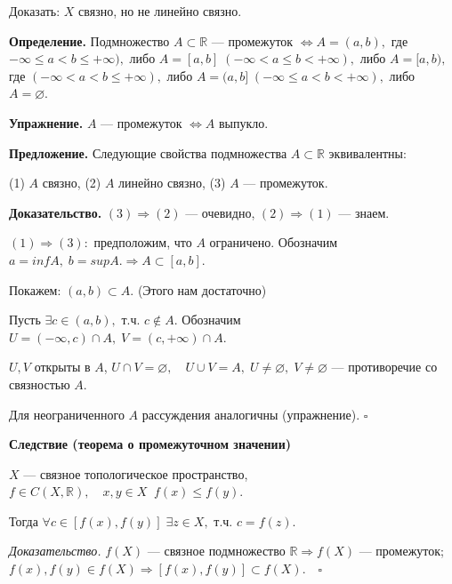 \documentclass[12pt,a4paper]{article}
\begin{document}
Доказать: $X$ связно, но не линейно связно. 

\textbf{Определение.} Подмножество $A \subset \mathbb{R}$ --- промежуток $\Leftrightarrow A = (a, b),$ где $-\infty \leq a < b \leq +\infty),$ либо $A = [a, b] \; (-\infty < a \leq b < +\infty),$ либо $A = [a, b),$ где $(-\infty < a < b \leq +\infty),$ либо $A = (a, b] \; (-\infty \leq a < b < +\infty),$ либо $A = \varnothing.$ 

\textbf{Упражнение.} $A$ --- промежуток $\Leftrightarrow A$ выпукло.

\textbf{Предложение.} Следующие свойства подмножества $A \subset \mathbb{R}$ эквивалентны:

(1) $A$ связно, (2) $A$ линейно связно, (3) $A$ --- промежуток. 

\textbf{Доказательство.} $(3) \Rightarrow (2)$ --- очевидно, $(2) \Rightarrow (1)$ --- знаем. 

$(1) \Rightarrow (3):$ предположим, что $A$ ограничено. Обозначим $a = inf A, \; b = sup A. \Rightarrow A \subset [a, b].$

Покажем: $(a, b) \subset A.$ (Этого нам достаточно)

Пусть $\exists c \in (a, b),$ т.ч. $c \not \in A.$ Обозначим $U = (-\infty, c) \cap A, \; V = (c, +\infty) \cap A.$

$U, V$ открыты в $A$, $U \cap V = \varnothing,\quad U \cup V = A, \; U \neq \varnothing, \; V \neq \varnothing$ --- противоречие со связностью $A$.

Для неограниченного $A$ рассуждения аналогичны (упражнение). $\square$

\textbf{Следствие (теорема о промежуточном значении)}

$X$ --- связное топологическое пространство, $f \in C(X, \mathbb{R}), \quad x, y \in X \;\; f(x) \leq f(y).$

Тогда $\forall c \in [f(x), f(y)] \; \exists z \in X,$ т.ч. $c = f(z).$

\textit{Доказательство.} $f(X)$ --- связное подмножество $\mathbb{R} \Rightarrow f(X)$ --- промежуток; $f(x), f(y) \in f(X) \Rightarrow [f(x), f(y)] \subset f(X). \quad \square$
\end{document}
